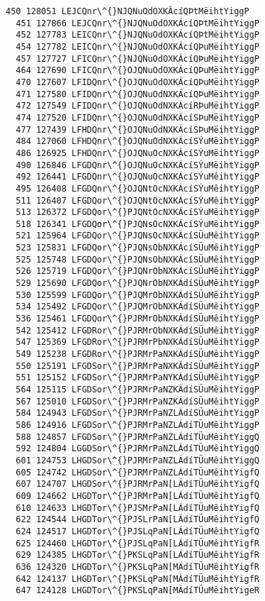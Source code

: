 \documentclass[11pt]{article}
\begin{document}
\begin{Verbatim}[commandchars=\\\{\}]
  450 128051 LEJCQnr\^{}NJQNuOdOXKÂcíQÞtMëihtYiggP
  451 127866 LEJCQnr\^{}NJQNuOdOXKÁcíQÞtMëihtYiggP
  452 127783 LEICQnr\^{}NJQNuOdOXKÁcíQÞtMëihtYiggP
  454 127782 LEICQnr\^{}NJQNuOdOXKÁcíQÞuMëihtYiggP
  457 127727 LFICQnr\^{}NJQNuOdOXKÁcíQÞuMëihtYiggP
  464 127690 LFICQnr\^{}OJQNuOdOXKÁcíQÞuMëihtYiggP
  470 127607 LFIDQnr\^{}OJQNuOdOXKÁcíQÞuMëihtYiggP
  471 127580 LFIDQnr\^{}OJQNuOdNXKÁcíQÞuMëihtYiggP
  472 127549 LFIDQnr\^{}OJQNuOdNXKÁcíRÞuMëihtYiggP
  474 127520 LFIDQnr\^{}OJQNuOdNXKÁcíSÞuMëihtYiggP
  477 127439 LFHDQnr\^{}OJQNuOdNXKÁcíSÞuMëihtYiggP
  484 127060 LFHDQnr\^{}OJQNuOdNXKÁcíSÝuMëihtYiggP
  486 126925 LFHDQnr\^{}OJQNuOcNXKÁcíSÝuMëihtYiggP
  490 126846 LFGDQnr\^{}OJQNuOcNXKÁcíSÝuMëihtYiggP
  492 126441 LFGDQnr\^{}OJQNuOcNXKÁcíSÝuMêihtYiggP
  495 126408 LFGDQnr\^{}OJQNtOcNXKÁcíSÝuMêihtYiggP
  511 126407 LFGDQor\^{}OJQNtOcNXKÁcíSÝuMêihtYiggP
  513 126372 LFGDQor\^{}PJQNtOcNXKÁcíSÝuMêihtYiggP
  518 126341 LFGDQor\^{}PJQNsOcNXKÁcíSÝuMêihtYiggP
  521 125964 LFGDQor\^{}PJQNsOcNXKÁcíSÜuMêihtYiggP
  523 125831 LFGDQor\^{}PJQNsObNXKÁcíSÜuMêihtYiggP
  525 125748 LFGDQor\^{}PJQNsObNXKÁcíSÜuMêihtYiggP
  526 125719 LFGDQor\^{}PJQNrObNXKÁcíSÜuMêihtYiggP
  529 125690 LFGDQor\^{}PJQNrObNXKÁdíSÜuMêihtYiggP
  530 125599 LFGDQor\^{}PJQMrObNXKÁdíSÜuMêihtYiggP
  534 125492 LFGDQor\^{}PJQMrObNXKÁdíSÜuMêihtYiggP
  536 125461 LFGDQor\^{}PJRMrObNXKÁdíSÜuMêihtYiggP
  542 125412 LFGDRor\^{}PJRMrObNXKÁdíSÜuMêihtYiggP
  547 125369 LFGDRor\^{}PJRMrPbNXKÁdíSÜuMêihtYiggP
  549 125238 LFGDRor\^{}PJRMrPaNXKÁdíSÜuMêihtYiggP
  550 125191 LFGDSor\^{}PJRMrPaNXKÁdíSÜuMêihtYiggP
  551 125152 LFGDSor\^{}PJRMrPaNYKÁdíSÜuMêihtYiggP
  564 125115 LFGDSor\^{}PJRMrPaNZKÁdíSÜuMêihtYiggP
  567 125010 LFGDSor\^{}PJRMrPaNZKÁdíSÜuMêihtYiggP
  584 124943 LFGDSor\^{}PJRMrPaNZLÁdíSÜuMêihtYiggP
  586 124916 LFGDSor\^{}PJRMrPaNZLÁdíTÜuMêihtYiggP
  588 124857 LFGDSor\^{}PJRMrPaNZLÁdíTÜuMêihtYiggQ
  592 124804 LGGDSor\^{}PJRMrPaNZLÁdíTÜuMêihtYiggQ
  601 124753 LHGDSor\^{}PJRMrPaNZLÁdíTÜuMêihtYiggQ
  605 124742 LHGDSor\^{}PJRMrPaNZLÁdíTÜuMêihtYigfQ
  607 124707 LHGDSor\^{}PJRMrPaN[LÁdíTÜuMêihtYigfQ
  609 124662 LHGDTor\^{}PJRMrPaN[LÁdíTÜuMêihtYigfQ
  610 124633 LHGDTor\^{}PJSMrPaN[LÁdíTÜuMêihtYigfQ
  622 124544 LHGDTor\^{}PJSLrPaN[LÁdíTÜuMêihtYigfQ
  624 124517 LHGDTor\^{}PJSLqPaN[LÁdíTÜuMêihtYigfQ
  625 124460 LHGDTor\^{}PJSLqPaN[LÁdíTÜuMêihtYigfR
  629 124385 LHGDTor\^{}PKSLqPaN[LÁdíTÜuMêihtYigfR
  636 124320 LHGDTor\^{}PKSLqPaN[MÁdíTÜuMêihtYigfR
  642 124137 LHGDTor\^{}PKSLqPaN[MÀdíTÜuMêihtYigfR
  647 124128 LHGDTor\^{}PKSLqPaN[MÀdíTÜuMêihtYigeR

\end{Verbatim}
\end{document}
